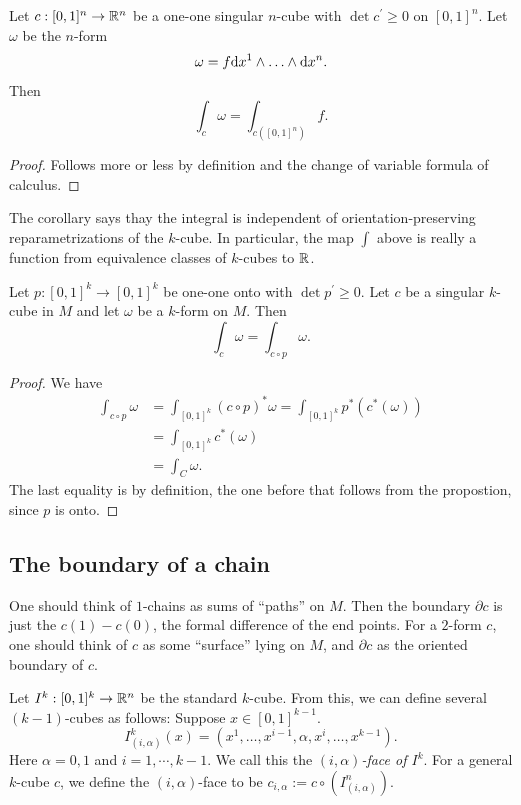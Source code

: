 \documentclass[11pt, english]{article}
\begin{document}
\begin{prop}
  Let $c:[0,1]^n \to \mathbb{R}^n$ be a one-one singular $n$-cube with $\det c^\prime \geq 0$ on $[0,1]^n$. Let $\omega$ be the $n$-form
\[
\omega = f \mathrm{d}{x}^1 \wedge \ldots \wedge \mathrm{d}{x}^n.
\]
Then
\[
\int_c \omega = \int_{c([0,1]^n)} f.
\]
\end{prop}
\begin{proof}
Follows more or less by definition and the change of variable formula of calculus.
\end{proof}

The corollary says thay the integral is independent of orientation-preserving reparametrizations of the $k$-cube. In particular, the map $\int$ above is really a function from equivalence classes of $k$-cubes to $\mathbb{R}$. 
\begin{corr}
  Let $p:[0,1]^k \to [0,1]^k$ be  one-one onto with $\det p^\prime \geq 0$. Let $c$ be a singular $k$-cube in $M$ and let $\omega$ be a $k$-form on $M$. Then
\[
\int_c \omega = \int_{c \circ p} \omega.
\]
\end{corr}
\begin{proof}
We have
\begin{align*}
  \int_{c \circ p} \omega &= \int_{[0,1]^k }(c \circ p)^\ast \omega = \int_{[0,1]^k} p^\ast ( c^\ast(\omega)) \\
&= \int_{[0,1]^k} c^\ast(\omega)\\
&= \int_C \omega.
\end{align*}
The last equality is by definition, the one before that follows from the propostion, since $p$ is onto.
\end{proof}

\subsection{The boundary of a chain}

One should think of $1$-chains as sums of ``paths'' on $M$. Then the boundary $\partial c$ is just the $c(1)-c(0)$, the formal difference of the end points. For a $2$-form $c$, one should think of $c$ as some ``surface'' lying on $M$, and $\partial c$ as the oriented boundary of $c$.

Let $I^k:[0,1]^k \to \mathbb{R}^n$ be the standard $k$-cube. From this, we can define several $(k-1)$-cubes as follows: Suppose $x \in [0,1]^{k-1}$.
\[
I^k_{(i,\alpha)}(x) = (x^1,\ldots, x^{i-1},\alpha, x^i,\ldots, x^{k-1}).
\]
Here $\alpha=0,1$ and $i=1,\cdots,k-1$. We call this the \emph{$(i,\alpha)$-face of $I^k$}. For a general $k$-cube $c$, we define the $(i,\alpha)$-face to be $c_{i,\alpha} := c \circ (I^n_{(i,\alpha)})$.
\end{document}
